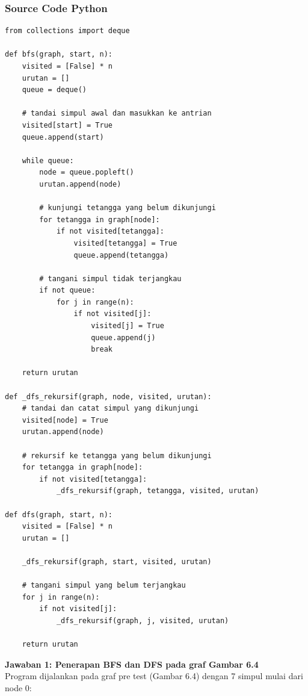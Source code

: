 \subsubsection*{Source Code Python}
\begin{lstlisting}[basicstyle=\ttfamily\scriptsize, frame=single, backgroundcolor=\color{white}, numbers=none, keywordstyle=\color{black}, commentstyle=\color{black}, stringstyle=\color{black}, breaklines=true]
from collections import deque

def bfs(graph, start, n):
    visited = [False] * n
    urutan = []
    queue = deque()
    
    # tandai simpul awal dan masukkan ke antrian
    visited[start] = True
    queue.append(start)
    
    while queue:
        node = queue.popleft()
        urutan.append(node)
        
        # kunjungi tetangga yang belum dikunjungi
        for tetangga in graph[node]:
            if not visited[tetangga]:
                visited[tetangga] = True
                queue.append(tetangga)
                
        # tangani simpul tidak terjangkau
        if not queue:
            for j in range(n):
                if not visited[j]:
                    visited[j] = True
                    queue.append(j)
                    break
                    
    return urutan

def _dfs_rekursif(graph, node, visited, urutan):
    # tandai dan catat simpul yang dikunjungi
    visited[node] = True
    urutan.append(node)
    
    # rekursif ke tetangga yang belum dikunjungi
    for tetangga in graph[node]:
        if not visited[tetangga]:
            _dfs_rekursif(graph, tetangga, visited, urutan)

def dfs(graph, start, n):
    visited = [False] * n
    urutan = []
    
    _dfs_rekursif(graph, start, visited, urutan)
    
    # tangani simpul yang belum terjangkau
    for j in range(n):
        if not visited[j]:
            _dfs_rekursif(graph, j, visited, urutan)
            
    return urutan
\end{lstlisting}

\textbf{Jawaban 1: Penerapan BFS dan DFS pada graf Gambar 6.4}\\
Program dijalankan pada graf pre test (Gambar 6.4) dengan 7 simpul mulai dari node 0:

